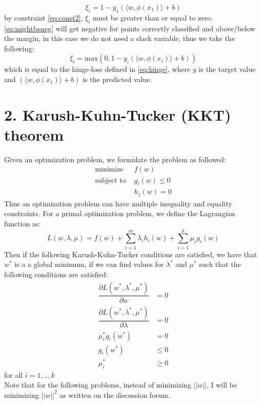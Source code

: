 \documentclass{article}
\begin{document}
\begin{equation}
\label{eq:mightbeneg}
\xi_i = 1-y_1(\langle w,\phi(x_1) \rangle +b)
\end{equation}
by constraint \eqref{eq:const2}, $\xi_i$ must be greater than or equal to zero. \eqref{eq:mightbeneg} will get negative for points correctly classified and above/below the margin, in this case we do not need a slack variable, thus we take the following:
\begin{equation}
\xi_i = \text{max}(0,1-y_i(\langle w, \phi(x_i)\rangle +b ))
\end{equation}
which is equal to the hinge-loss defined in \eqref{eq:hinge}, where $y$ is the target value and $(\langle w,\phi(x_1) \rangle +b)$ is the predicted value. 
\section{2. Karush-Kuhn-Tucker (KKT) theorem}
Given an optimization problem, we formulate the problem as followed:
\begin{align}
\text{minimize } &f(w) \\
\label{eq:ineqconst}
\text{subject to } &g_i(w) \leq 0 \\
&h_j(w) = 0
\end{align}
Thus an optimization problem can have multiple inequality and equality constraints. For a primal optimization problem, we define the Lagrangian function as:
\begin{equation}
L(w,\lambda,\mu) = f(w) + \sum_{i=1}^m \lambda_i h_i(w) + \sum\limits_{i=1}^k \mu_i g_i(w)
\end{equation}
Then if the following Karush-Kuhn-Tucker conditions are satisfied, we have that $w^*$ is a a global minimum, if we can find values for $\lambda^*$ and $\mu^*$ such that the following conditions are satisfied:
\begin{align}
\dfrac{\partial L (w^*, \lambda^*, \mu^*)}{\partial w} &= 0 \\
\dfrac{\partial L (w^*, \lambda^*,\mu^*)}{\partial \lambda} &= 0 \\
\mu_i^* g_i(w^*) &= 0 \\
g_i(w^*) &\leq 0 \\
\mu_i^* &\geq 0
\end{align}
for all $i=1,..,k$ \\
Note that for the following problems, instead of minimizing $||w||$, I will be minimizing $||w||^2$ as written on the discussion forum.
\end{document}
